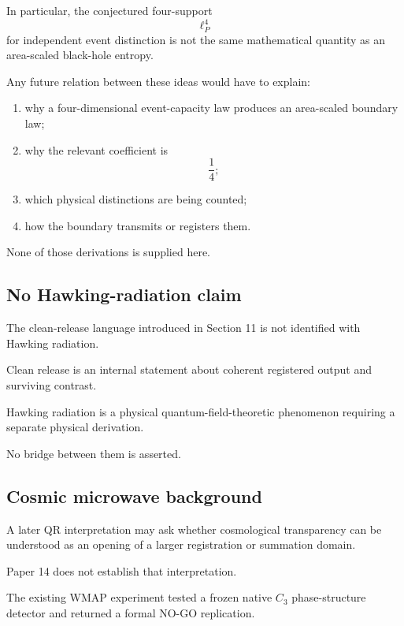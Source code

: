 In particular, the conjectured four-support
\[
\ell_P^4
\]
for independent event distinction is not the same mathematical
quantity as an area-scaled black-hole entropy.

Any future relation between these ideas would have to explain:

\begin{enumerate}[label=(\roman*)]

\item why a four-dimensional event-capacity law produces an
area-scaled boundary law;

\item why the relevant coefficient is
\[
\frac14;
\]

\item which physical distinctions are being counted;

\item how the boundary transmits or registers them.

\end{enumerate}

None of those derivations is supplied here.

\subsection{No Hawking-radiation claim}

The clean-release language introduced in Section 11 is not identified
with Hawking radiation.

Clean release is an internal statement about coherent registered
output and surviving contrast.

Hawking radiation is a physical quantum-field-theoretic phenomenon
requiring a separate physical derivation.

No bridge between them is asserted.

\subsection{Cosmic microwave background}

A later QR interpretation may ask whether cosmological transparency
can be understood as an opening of a larger registration or
summation domain.

Paper 14 does not establish that interpretation.

The existing WMAP experiment tested a frozen native \(C_3\)
phase-structure detector and returned a formal NO-GO replication.

